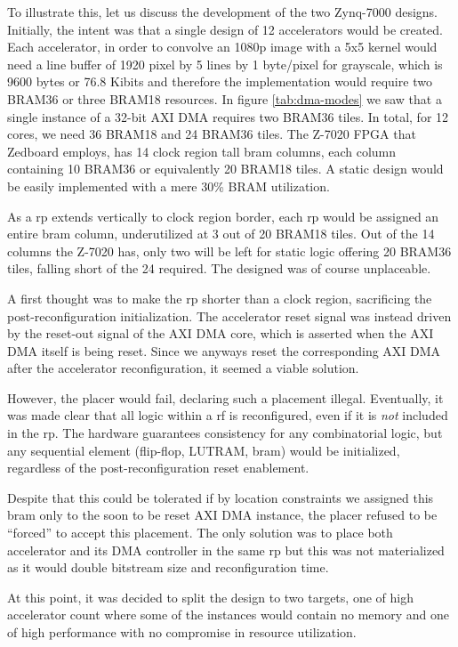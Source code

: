 To illustrate this, let us discuss the development of the two Zynq-7000 designs.
Initially, the intent was that a single design of 12 accelerators would be created.
Each accelerator, in order to convolve an 1080p image with a 5x5 kernel would need
a line buffer of 1920 pixel by 5 lines by 1 byte/pixel for grayscale, which is 9600 bytes
or 76.8 Kibits and therefore the implementation would require
two BRAM36 or three BRAM18 resources. In figure \ref{tab:dma-modes} we saw that a single
instance of a 32-bit AXI DMA requires two BRAM36 tiles. In total, for 12 cores,
we need 36 BRAM18 and 24 BRAM36 tiles. The Z-7020 FPGA that Zedboard employs,
has 14 clock region tall \gls{bram} columns,
each column containing 10 BRAM36 or equivalently 20 BRAM18 tiles.
A static design would be easily implemented with a mere 30\% BRAM utilization.

As a \gls{rp} extends vertically to clock region border, each \gls{rp}
would be assigned an entire \gls{bram} column, underutilized at 3 out of 20 BRAM18 tiles.
Out of the 14 columns the Z-7020 has, only two will be left for static logic offering 20 BRAM36 tiles,
falling short of the 24 required. The designed was of course unplaceable.

A first thought was to make the \gls{rp} shorter than a clock region,
sacrificing the post-reconfiguration initialization.
The accelerator reset signal was instead driven by the reset-out signal of the AXI DMA core,
which is asserted when the AXI DMA itself is being reset.
Since we anyways reset the corresponding AXI DMA after the accelerator reconfiguration,
it seemed a viable solution.

However, the placer would fail, declaring such a placement illegal.
Eventually, it was made clear that all logic within a \gls{rf}
is reconfigured, even if it is \emph{not} included in the \gls{rp}.
The hardware guarantees consistency for any combinatorial logic,
but any sequential element (flip-flop, LUTRAM, \gls{bram}) would be initialized,
regardless of the post-reconfiguration reset enablement.

Despite that this could be tolerated if by location constraints we assigned this \gls{bram}
only to the soon to be reset AXI DMA instance, the placer refused to be ``forced'' to accept
this placement. The only solution was to place both accelerator and its DMA controller in
the same \gls{rp} but this was not materialized as it would
double bitstream size and reconfiguration time.

At this point, it was decided to split the design
to two targets, one of high accelerator count where some of the instances would contain no memory
and one of high performance with no compromise in resource utilization.

